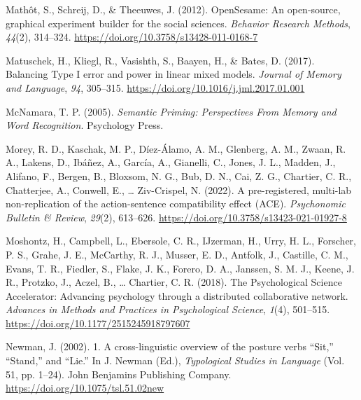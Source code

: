 \documentclass[
  man,floatsintext]{apa7}
\newlength{\cslhangindent}
\newlength{\cslentryspacingunit} %
\newenvironment{CSLReferences}[2] %
 {%
  \setlength{\parindent}{0pt}
  \ifodd #1
  \let\oldpar\par
  \def\par{\hangindent=\cslhangindent\oldpar}
  \fi
  \setlength{\parskip}{#2\cslentryspacingunit}
 }%
 {}
\begin{document}
\begin{CSLReferences}{1}{0}
\leavevmode{}%
Mathôt, S., Schreij, D., \& Theeuwes, J. (2012). {OpenSesame}: {An} open-source, graphical experiment builder for the social sciences. \emph{Behavior Research Methods}, \emph{44}(2), 314--324. \url{https://doi.org/10.3758/s13428-011-0168-7}

\leavevmode{}%
Matuschek, H., Kliegl, R., Vasishth, S., Baayen, H., \& Bates, D. (2017). Balancing Type I error and power in linear mixed models. \emph{Journal of Memory and Language}, \emph{94}, 305--315. \url{https://doi.org/10.1016/j.jml.2017.01.001}

\leavevmode{}%
McNamara, T. P. (2005). \emph{Semantic {Priming}: {Perspectives From Memory} and {Word Recognition}}. {Psychology Press}.

\leavevmode{}%
Morey, R. D., Kaschak, M. P., Díez-Álamo, A. M., Glenberg, A. M., Zwaan, R. A., Lakens, D., Ibáñez, A., García, A., Gianelli, C., Jones, J. L., Madden, J., Alifano, F., Bergen, B., Bloxsom, N. G., Bub, D. N., Cai, Z. G., Chartier, C. R., Chatterjee, A., Conwell, E., \ldots{} Ziv-Crispel, N. (2022). A pre-registered, multi-lab non-replication of the action-sentence compatibility effect (ACE). \emph{Psychonomic Bulletin \& Review}, \emph{29}(2), 613--626. \url{https://doi.org/10.3758/s13423-021-01927-8}

\leavevmode{}%
Moshontz, H., Campbell, L., Ebersole, C. R., IJzerman, H., Urry, H. L., Forscher, P. S., Grahe, J. E., McCarthy, R. J., Musser, E. D., Antfolk, J., Castille, C. M., Evans, T. R., Fiedler, S., Flake, J. K., Forero, D. A., Janssen, S. M. J., Keene, J. R., Protzko, J., Aczel, B., \ldots{} Chartier, C. R. (2018). The {Psychological Science Accelerator}: {Advancing} psychology through a distributed collaborative network. \emph{Advances in Methods and Practices in Psychological Science}, \emph{1}(4), 501--515. \url{https://doi.org/10.1177/2515245918797607}

\leavevmode{}%
Newman, J. (2002). 1. {A} cross-linguistic overview of the posture verbs {``{Sit},''} {``{Stand},''} and {``{Lie}.''} In J. Newman (Ed.), \emph{Typological {Studies} in {Language}} (Vol. 51, pp. 1--24). {John Benjamins Publishing Company}. \url{https://doi.org/10.1075/tsl.51.02new}


\end{CSLReferences}
\end{document}
